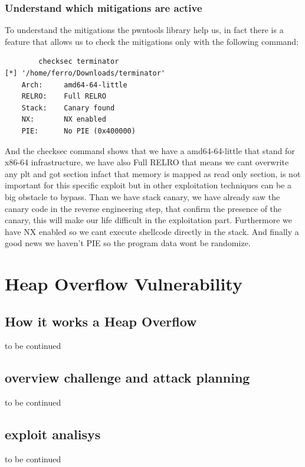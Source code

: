 \documentclass{report}
\begin{document}
    \subsection{Understand which mitigations are active}
To understand the mitigations the pwntools library help us, in fact there is a feature that allows us to check the mitigations only with the following command:
    \begin{verbatim}
        checksec terminator                                     
[*] '/home/ferro/Downloads/terminator'
    Arch:     amd64-64-little
    RELRO:    Full RELRO
    Stack:    Canary found
    NX:       NX enabled
    PIE:      No PIE (0x400000)
    \end{verbatim}
    And the checksec command shows that we have a amd64-64-little that stand for x86-64 infrastructure, we have also Full RELRO that means we cant overwrite any plt and got section infact that memory is mapped as read only section, is not important for this specific exploit but in other exploitation techniques can be a big obstacle to bypass.\newline
    Than we have stack canary, we have already saw the canary code in the reverse engineering step, that confirm the presence of the canary, this will make our life difficult in the exploitation part.\newline
    Furthermore we have NX enabled so we cant execute shellcode directly in the stack.\newline
    And finally a good news we haven't PIE so the program data wont be randomize.\newline
    \chapter{Heap Overflow Vulnerability}
    \section{How it works a Heap Overflow}
    to be continued
    \clearpage
    \section{overview challenge and attack planning}
    to be continued
    \clearpage
    \section{exploit analisys}
    to be continued
    \clearpage
\end{document}
